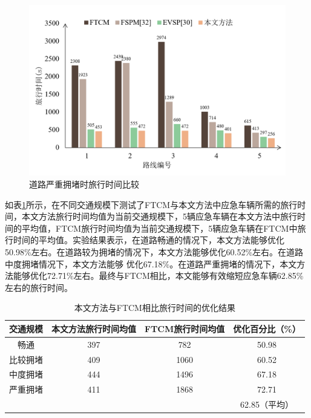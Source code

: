 
\begin{figure}
	\centering
	\includegraphics[width=\linewidth]{figures/travel_time4.png}
	\caption{道路严重拥堵时旅行时间比较}
	\label{fig:travel_time_severe_congestion}
\end{figure}


如表\ref{table:travel_time_my_FTCM}所示，在不同交通规模下测试了FTCM与本文方法中应急车辆所需的旅行时间，本文方法旅行时间均值为当前交通规模下，5辆应急车辆在本文方法中旅行时间的平均值，FTCM旅行时间均值为当前交通规模下，5辆应急车辆在FTCM中旅行时间的平均值。实验结果表示，在道路畅通的情况下，本文方法能够优化50.98\%左右。在道路较为拥堵的情况下，本文方法能够优化60.52\%左右。在道路中度拥堵情况下，本文方法能够 优化67.18\%。在道路严重拥堵的情况下，本文方法能够优化72.71\%左右。最终与FTCM相比，本文能够有效缩短应急车辆62.85\%左右的旅行时间。

\begin{table}[H]
	\centering
	\caption{本文方法与FTCM相比旅行时间的优化结果}
	\label{table:travel_time_my_FTCM}
	\begin{tabular}{|c|c|c|c|}
		\hline
		交通规模  & 本文方法旅行时间均值 & FTCM旅行时间均值 & 优化百分比（\%） \\ \hline
		畅通     & 397      & 782     & 50.98  \\ \hline
		比较拥堵 & 409      & 1060    & 60.52  \\ \hline
		中度拥堵 & 444      & 1496    & 67.18  \\ \hline
		严重拥堵 & 411      & 1868    & 72.71  \\ \hline
		  &  &  & 62.85（平均） \\ \hline
	\end{tabular}
\end{table}



